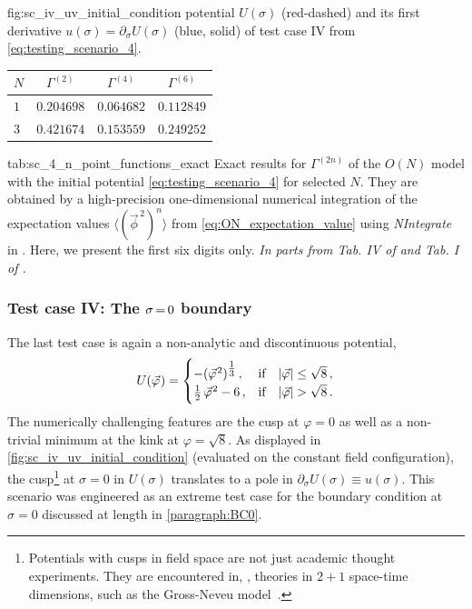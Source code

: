 	{fig:sc_iv_uv_initial_condition} %
	{%
		\uv{} potential $U ( \sigma )$ (red-dashed) and its first derivative $u ( \sigma ) = \partial_\sigma U ( \sigma )$ (blue, solid) of test case IV from \cref{eq:testing_scenario_4}. 
	} %
	{%
		\renewcommand{\arraystretch}{1.15}
		\small
		\begin{tabular}{l c c c}
			\toprule
			$N$		&	$\Gamma^{(2)}$	&	$\Gamma^{(4)}$	&	$\Gamma^{(6)}$	\\
			\midrule
			$1$	&	$0.204698$	&	$0.064682$	&	$0.112849$\\
			$3$	&	$0.421674$	&	$0.153559$	&	$0.249252$\\
			\bottomrule
		\end{tabular}
	} %
	{tab:sc_4_n_point_functions_exact}%
	{%
		Exact results for $\Gamma^{(2n)}$ of the $O(N)$ model with the \uv{} initial potential \eqref{eq:testing_scenario_4} for selected $N$.
		They are obtained by a high-precision one-dimensional numerical integration of the expectation values $\langle ( \vec{\phi}^{\, 2} )^n \rangle$ from \cref{eq:ON_expectation_value} using \textit{NIntegrate} in \WAMXIIwR{}.
		Here, we present the first six digits only.
		\textit{In parts from Tab. IV of  and Tab. I of .}%
	} %
\subsubsection{Test case IV: The \texorpdfstring{$\sigma\mkern-2mu=\mkern-2mu0$}{sigma=0} boundary}
\label{subsubsec:sc4}
The last test case is again a non-analytic and discontinuous potential,
\begin{align}
	U ( \vec{\varphi} \mskip1.0mu ) =
	\begin{cases}
		- ( \vec{\varphi}^{\mskip1.0mu 2} )^{\tfrac{1}{3}} \, ,			&	\text{if} \quad |\vec{\varphi}| \leq \sqrt{8} \, ,\\
		\tfrac{1}{2} \, \vec{\varphi}^{\mskip1.0mu 2} - 6 \, ,							&	\text{if} \quad |\vec{\varphi}| > \sqrt{8} \, .
	\end{cases}	\label{eq:testing_scenario_4}
\end{align}
The numerically challenging features are the cusp at $\varphi = 0$ as well as a non-trivial minimum at the kink at $\varphi = \sqrt{8}$.
As displayed in \cref{fig:sc_iv_uv_initial_condition} (evaluated on the constant field configuration), the cusp\footnote{
	Potentials with cusps in field space are not just academic thought experiments.
	They are encountered in, \eg{}, theories in $2+1$ space-time dimensions, such as the Gross-Neveu model~\cite{Braun:2010tt}.
} at $\sigma = 0$ in $U(\sigma)$ translates to a pole in $\partial_\sigma U(\sigma)\equiv u(\sigma)$.
This scenario was engineered as an extreme test case for the boundary condition at $\sigma = 0$ discussed at length in \cref{paragraph:BC0}.

